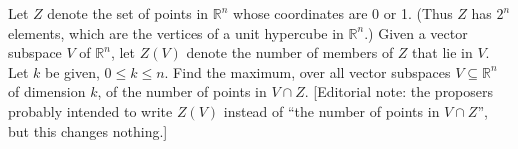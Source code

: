 Let $Z$ denote the set of points in $\mathbb{R}^n$ whose coordinates are 0
or 1. (Thus $Z$ has $2^n$ elements, which are the vertices of a unit
hypercube in $\mathbb{R}^n$.) Given a vector subspace $V$
of $\mathbb{R}^n$, let $Z(V)$
denote the number of members of $Z$ that lie in $V$. Let $k$ be given,
$0 \leq k \leq n$. Find the maximum, over all vector subspaces $V
\subseteq \mathbb{R}^n$ of dimension $k$, of the number of points in
$V \cap Z$. [Editorial note: the proposers probably intended to write
$Z(V)$ instead of
``the number of points in $V \cap Z$'', but this changes nothing.]

